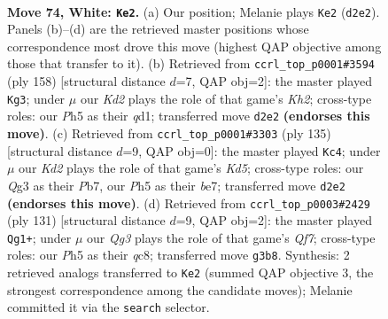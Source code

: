 \documentclass[11pt]{article}
\begin{document}
\clearpage

\begin{figure}[p]\centering
\begin{subfigure}{0.46\textwidth}\centering
\resizebox{\linewidth}{!}{%
\newchessgame
\chessboard[
  setfen={8/6P1/4P3/7P/1k6/6Q1/3K4/8 w - - 5 74},
  showmover=false,
  pgfstyle=straightmove, color=movearrow, markmove={d2-e2}
]}
\caption{}
\end{subfigure}\hfill
\begin{subfigure}{0.46\textwidth}\centering
\resizebox{\linewidth}{!}{%
\newchessgame
\chessboard[
  setfen={5Q2/1k6/8/8/5P2/8/7K/3q4 w - - 0 80},
  showmover=false,
  pgfstyle=straightmove, color=movearrow, markmove={h2-g3}
]}
\caption{}
\end{subfigure}
\\[4pt]
\begin{subfigure}{0.46\textwidth}\centering
\resizebox{\linewidth}{!}{%
\newchessgame
\chessboard[
  setfen={8/1p2B3/8/P4K2/3k4/2p5/8/8 b - - 1 68},
  showmover=false,
  pgfstyle=straightmove, color=movearrow, markmove={d4-c4}
]}
\caption{}
\end{subfigure}\hfill
\begin{subfigure}{0.46\textwidth}\centering
\resizebox{\linewidth}{!}{%
\newchessgame
\chessboard[
  setfen={2Q5/4k1P1/8/6K1/8/8/p4q2/8 b - - 6 66},
  showmover=false,
  pgfstyle=straightmove, color=movearrow, markmove={f2-g1}
]}
\caption{}
\end{subfigure}
\caption{\textbf{Move 74, White: \texttt{Ke2}.} (a) Our position; Melanie plays \texttt{Ke2} (\texttt{d2e2}). Panels (b)--(d) are the retrieved master positions whose correspondence most drove this move (highest QAP objective among those that transfer to it). (b) Retrieved from \texttt{ccrl\_top\_p0001\#3594} (ply 158) [structural distance $d$=7, QAP obj=2]: the master played \texttt{Kg3}; under $\mu$ our \emph{Kd2} plays the role of that game's \emph{Kh2}; cross-type roles: our \emph{P}h5 as their \emph{q}d1; transferred move \texttt{d2e2} \textbf{(endorses this move)}. (c) Retrieved from \texttt{ccrl\_top\_p0001\#3303} (ply 135) [structural distance $d$=9, QAP obj=0]: the master played \texttt{Kc4}; under $\mu$ our \emph{Kd2} plays the role of that game's \emph{Kd5}; cross-type roles: our \emph{Q}g3 as their \emph{P}b7, our \emph{P}h5 as their \emph{b}e7; transferred move \texttt{d2e2} \textbf{(endorses this move)}. (d) Retrieved from \texttt{ccrl\_top\_p0003\#2429} (ply 131) [structural distance $d$=9, QAP obj=2]: the master played \texttt{Qg1+}; under $\mu$ our \emph{Qg3} plays the role of that game's \emph{Qf7}; cross-type roles: our \emph{P}h5 as their \emph{q}c8; transferred move \texttt{g3b8}. Synthesis: 2 retrieved analogs transferred to \texttt{Ke2} (summed QAP objective 3, the strongest correspondence among the candidate moves); Melanie committed it via the \texttt{search} selector.}
\label{fig:thought-m146}
\end{figure}
\end{document}
